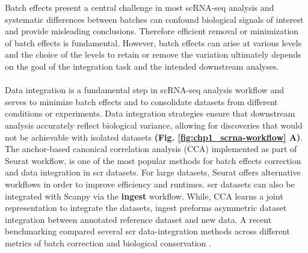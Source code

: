 Batch effects present a central challenge in most scRNA-seq analysis and systematic differences between batches can confound biological signals of interest and provide misleading conclusions. Therefore
efficient removal or minimization of batch effects is fundamental. However, batch effects can arise at various levels and the choice of the levels to retain or remove the variation ultimately depends on the goal of the integration task and the intended downstream analyses.\\\\
Data integration is a fundamental step in scRNA-seq analysis workflow and serves to minimize batch effects and to consolidate datasets from different conditions or experiments. 
Data integration strategies ensure that downstream analysis accurately reflect biological variance, allowing for discoveries that would not be achievable with isolated datasets \textbf{(Fig. \ref{fig:chp1_scrna-workflow} A)}.  %
The anchor-based canonical correlation analysis (CCA) implemented as part of Seurat \textbf{\cite{stuart_comprehensive_2019}} workflow, is one of the most popular methods for batch effects correction and data integration in \gls{scr} datasets. For large datasets, Seurat offers alternative workflows in order to improve efficiency and runtimes. \gls{scr} datasets can also be integrated with Scanpy via the \textbf{ingest} workflow. %
While, CCA learns a joint representation to integrate the datasets, ingest preforms asymmetric dataset integration between annotated reference dataset and new data. A recent benchmarking compared several \gls{scr} data-integration methods across different metrics of batch correction and biological conservation \textbf{\cite{luecken_benchmarking_2021}}.\\

